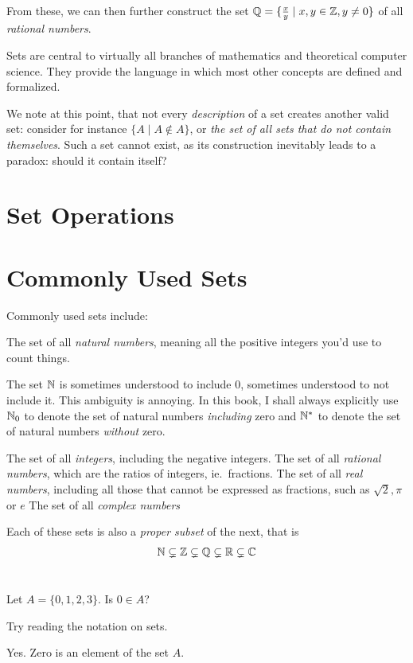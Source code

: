 From these, we can then further construct the set
\(\mathbb{Q} = \{\frac{x}{y} \mid x,y \in \mathbb{Z}, y \neq 0\}\) of all
\emph{rational numbers}.

Sets are central to virtually all branches of mathematics and theoretical
computer science. They provide the language in which most other concepts are
defined and formalized.

We note at this point, that not every \emph{description} of a set creates
another valid set: consider for instance \(\{A \mid A \notin A\}\), or \emph{the
set of all sets that do not contain themselves}. Such a set cannot exist, as its
construction inevitably leads to a paradox: should it contain itself?

\section{Set Operations}

\section{Commonly Used Sets}
Commonly used sets include:
\begin{itemize}
  \ii{\(\NN\):} The set of all \emph{natural numbers}, meaning all the positive integers
        you'd use to count things.
\begin{remark}
  The set \(\NN\) is sometimes understood to include \(0\), sometimes understood
  to not include it. This ambiguity is annoying.
  In this book, I shall always explicitly use \(\mathbb{N}_{0}\) to denote the set of
  natural numbers \emph{including} zero and \(\mathbb{N}^{*}\) to denote the set of
  natural numbers \emph{without} zero.
\end{remark}
  \ii{\(\ZZ\):} The set of all \emph{integers}, including the negative integers.
  \ii{\(\QQ\)} The set of all \emph{rational numbers}, which are the ratios of integers,
        ie.\ fractions.
  \ii{\(\RR\):} The set of all \emph{real numbers}, including all those that cannot be
        expressed as fractions, such as \(\sqrt{2}, \pi\) or \(e\)
  \ii{\(\CC\)} The set of all \emph{complex numbers}
\end{itemize}

Each of these sets is also a \emph{proper subset} of the next, that is
\begin{align*}
  \mathbb{N} \subsetneq \mathbb{Z} \subsetneq \mathbb{Q} \subsetneq \mathbb{R} \subsetneq \mathbb{C}
\end{align*}

\section{\problemhead}
\begin{problem}
  Let \(A=\{0,1,2,3\}\). Is \(0 \in A\)?
  \begin{hint}
    Try reading the notation on sets.
  \end{hint}
  \begin{sol}
    Yes. Zero is an element of the set \(A\).
  \end{sol}
\end{problem}
